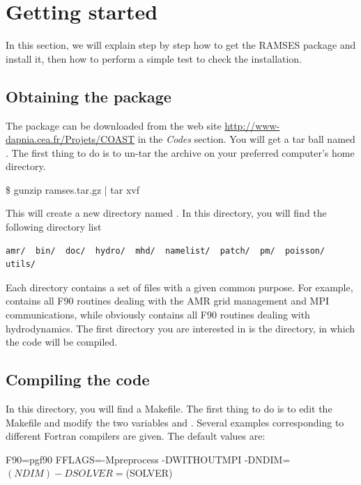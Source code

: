 \clearpage
\section{Getting started}

In this section, we will explain step by step how to get the RAMSES
package and install it, then how to perform a simple test to check the
installation.

\subsection{Obtaining the package}

The package can be downloaded from the web site
\url{http://www-dapnia.cea.fr/Projets/COAST} in the \emph{Codes}
section. You will get a tar ball named . The first
thing to do is to un-tar the archive on your preferred computer's home
directory.

\begin{Prompt}
\$ gunzip ramses.tar.gz | tar xvf
\end{Prompt}

This will create a new directory named . In this directory,
you will find the following directory list

\begin{Verbatim}
amr/  bin/  doc/  hydro/  mhd/  namelist/  patch/  pm/  poisson/  utils/
\end{Verbatim}

Each directory contains a set of files with a given common purpose. For
example,  contains all F90 routines dealing with the AMR grid
management and MPI communications, while  obviously contains
all F90 routines dealing with hydrodynamics. The first directory you are
interested in is the  directory, in which the code will be
compiled.

\subsection{Compiling the code}

In this  directory, you will find a Makefile. The first thing
to do is to edit the Makefile and modify the two variables 
and . Several examples corresponding to different Fortran
compilers are given. The default values are:

\begin{Prompt}
F90=pgf90
FFLAGS=-Mpreprocess -DWITHOUTMPI -DNDIM=$(NDIM) -DSOLVER=$(SOLVER)
\end{Prompt}

